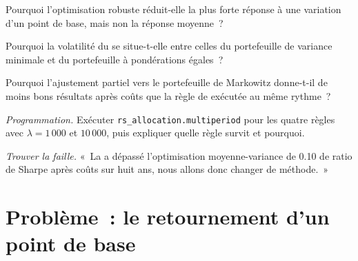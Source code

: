 \begin{exercise}[$\star\star$]\label{exo:rs:portfolio-construction-ii:4}
Pourquoi l'optimisation robuste réduit-elle la plus forte réponse à une variation d'un point de base, mais non la réponse moyenne~?
\end{exercise}

\begin{exercise}[$\star\star$]\label{exo:rs:portfolio-construction-ii:5}
Pourquoi la volatilité du  se situe-t-elle entre celles du portefeuille de variance minimale et du portefeuille à pondérations égales~?
\end{exercise}

\begin{exercise}[$\star\star$]\label{exo:rs:portfolio-construction-ii:6}
Pourquoi l'ajustement partiel vers le portefeuille de Markowitz donne-t-il de moins bons résultats après coûts que la règle de  exécutée au même rythme~?
\end{exercise}

\begin{exercise}[$\star\star\star$]\label{exo:rs:portfolio-construction-ii:7}
\emph{Programmation.} Exécuter \texttt{rs\_allocation.multiperiod} pour les quatre règles avec $\lambda = 1\,000$ et $10\,000$, puis expliquer quelle règle survit et pourquoi.
\end{exercise}

\begin{exercise}[$\star\star\star$]\label{exo:rs:portfolio-construction-ii:8}
\emph{Trouver la faille.} «~La  a dépassé l'optimisation moyenne-variance de 0.10 de ratio de Sharpe après coûts sur huit ans, nous allons donc changer de méthode.~»
\end{exercise}

\section{Problème~: le retournement d'un point de base}

